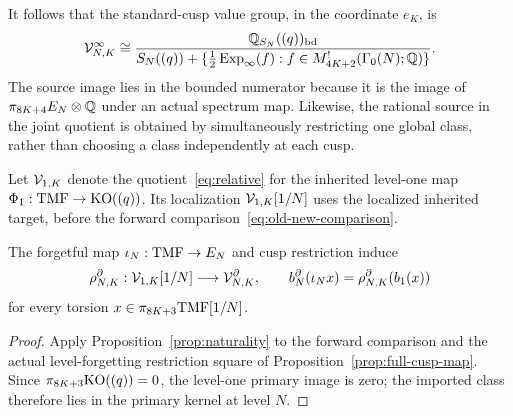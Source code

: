 It follows that the standard-cusp value group, in the coordinate $e_K$, is
\begin{equation}\label{eq:standard-value}
 \mathcal V_{N,K}^{\infty}\cong
 \frac{\mathbb Q_{S_N}((q))_{\mathrm{bd}}}
 {S_N((q))+
  \{\tfrac12\operatorname{Exp}_\infty(f):f\in M_{4K+2}^!(\Gamma_0(N);\mathbb Q)\}}.
\end{equation}
The source image lies in the bounded numerator because it is the
image of $\pi_{8K+4}E_N\otimes\mathbb Q$ under an actual spectrum map.
Likewise, the rational source in the joint quotient is obtained by
simultaneously restricting one global class, rather than choosing
a class independently at each cusp.

Let $\mathcal V_{1,K}$ denote the quotient~\eqref{eq:relative} for the
inherited level-one map $\Phi_1:\mathrm{TMF}\to\mathrm{KO}((q))$. Its localization
$\mathcal V_{1,K}[1/N]$ uses the localized inherited target, before the
forward comparison~\eqref{eq:old-new-comparison}.
\begin{corollary}\label{cor:level-naturality}
The forgetful map $\iota_N:\mathrm{TMF}\to E_N$ and cusp restriction induce
\[
 \rho_{N,K}^\partial:\mathcal V_{1,K}[1/N]\longrightarrow\mathcal V_{N,K}^\partial,
 \qquad
 b_N^\partial(\iota_Nx)=\rho_{N,K}^\partial(b_1(x))
\]
for every torsion $x\in\pi_{8K+3}\mathrm{TMF}[1/N]$.
\end{corollary}
\begin{proof}
Apply Proposition~\ref{prop:naturality} to the forward comparison
and the actual level-forgetting restriction square of
Proposition~\ref{prop:full-cusp-map}. Since
$\pi_{8K+3}\mathrm{KO}((q))=0$, the level-one primary image is zero;
the imported class therefore lies in the primary kernel at level $N$.
\end{proof}
